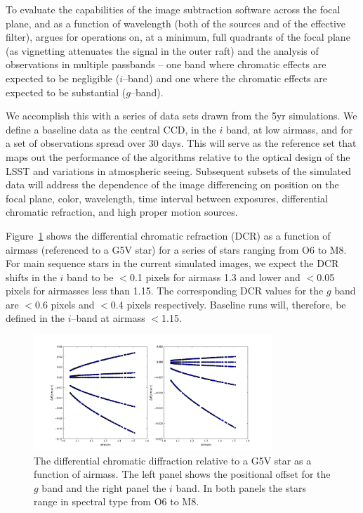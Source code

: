 \documentclass[prd, nofootinbib, floatfix, 11pt,tightenlines,times]{article}
\begin{document}
To evaluate the capabilities of the image subtraction software across
the focal plane, and as a function of wavelength (both of the sources
and of the effective filter), argues for operations on, at a minimum,
full quadrants of the focal plane (as vignetting attenuates the signal
in the outer raft) and the analysis of observations in multiple
passbands -- one band where chromatic effects are expected to be
negligible ($i$--band) and one where the chromatic effects are
expected to be substantial ($g$--band).

We accomplish this with a series of data sets drawn from the 5yr
simulations. We define a baseline data as the central CCD, in the $i$
band, at low airmass, and for a set of observations spread
over 30 days.  This will serve as the reference set that maps out the
performance of the algorithms relative to the optical design of the
LSST and variations in atmospheric seeing. Subsequent subsets of the
simulated data will address the dependence of the image differencing
on position on the focal plane, color, wavelength, time interval
between exposures, differential chromatic refraction, and high proper
motion sources. 

Figure~\ref{DCR} shows the differential chromatic refraction (DCR) as
a function of airmass (referenced to a G5V star) for a series of stars
ranging from O6 to M8. For main sequence stars in the current
simulated images, we expect the DCR shifts in the $i$ band to be
$<$0.1 pixels for airmass 1.3 and lower and $<$0.05 pixels for
airmasses less than 1.15. The corresponding DCR values for the $g$
band are $<$0.6 pixels and $<$0.4 pixels respectively. Baseline runs
will, therefore, be defined in the $i$--band at airmass $<$1.15.

\begin{figure}
\centerline{\includegraphics[width=0.8\textwidth]{Figures/DCR_R_stars.png}}
\caption{The differential chromatic diffraction relative to a G5V star
  as a function of airmass. The left panel shows the positional offset
  for the $g$ band and the right panel the $i$ band. In both panels
  the stars range in spectral type from O6 to M8.}
\label{DCR}
\end{figure}
\end{document}

